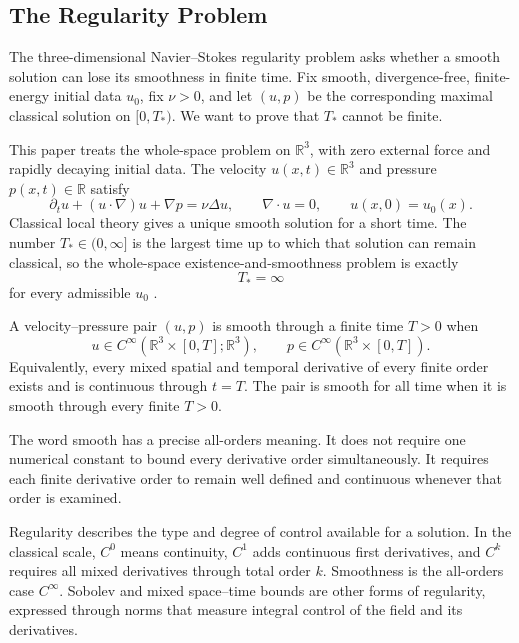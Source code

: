 \subsection{The Regularity Problem}\label{sub:TheRegularityProblem}

The three-dimensional Navier--Stokes regularity problem asks whether a smooth solution can lose its smoothness in finite time.
Fix smooth, divergence-free, finite-energy initial data \(u_0\), fix \(\nu>0\), and let \((u,p)\) be the corresponding maximal classical solution on \([0,T_*)\).
We want to prove that \(T_*\) cannot be finite.

This paper treats the whole-space problem on \(\mathbb R^3\), with zero external force and rapidly decaying initial data.
The velocity \(u(x,t)\in\mathbb R^3\) and pressure \(p(x,t)\in\mathbb R\) satisfy
\[
  \partial_tu+(u\cdot\nabla)u+\nabla p
  =
  \nu\Delta u,
  \qquad
  \nabla\cdot u=0,
  \qquad
  u(x,0)=u_0(x).
\]
Classical local theory gives a unique smooth solution for a short time.
The number \(T_*\in(0,\infty]\) is the largest time up to which that solution can remain classical, so the whole-space existence-and-smoothness problem is exactly
\[
  T_*=\infty
\]
for every admissible \(u_0\) \parencite{Fefferman2000}.


\begin{definition}[Smoothness]\label{def:Smoothness}
A velocity--pressure pair \((u,p)\) is smooth through a finite time \(T>0\) when
\[
  u\in C^\infty\!\left(\mathbb R^3\times[0,T];\mathbb R^3\right),
  \qquad
  p\in C^\infty\!\left(\mathbb R^3\times[0,T]\right).
\]
Equivalently, every mixed spatial and temporal derivative of every finite order exists and is continuous through \(t=T\).
The pair is smooth for all time when it is smooth through every finite \(T>0\).
\end{definition}

The word smooth has a precise all-orders meaning.
It does not require one numerical constant to bound every derivative order simultaneously.
It requires each finite derivative order to remain well defined and continuous whenever that order is examined.


\begin{definition}[Regularity]\label{def:Regularity}
Regularity describes the type and degree of control available for a solution.
In the classical scale, \(C^0\) means continuity, \(C^1\) adds continuous first derivatives, and \(C^k\) requires all mixed derivatives through total order \(k\).
Smoothness is the all-orders case \(C^\infty\).
Sobolev and mixed space--time bounds are other forms of regularity, expressed through norms that measure integral control of the field and its derivatives.
\end{definition}

